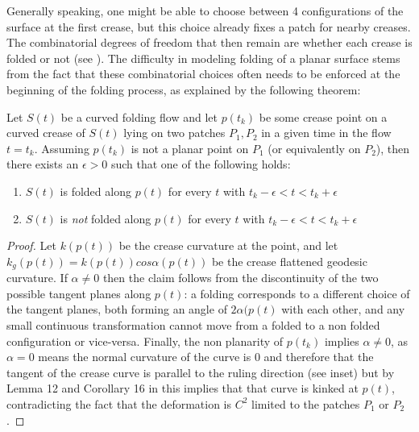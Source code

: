 Generally speaking, one might be able to choose between 4 configurations of the surface at the first crease, but this choice already fixes a patch for nearby creases. The combinatorial degrees of freedom that then remain are whether each crease is folded or not (see  ). The difficulty in modeling folding of a planar surface stems from the fact that these combinatorial choices often needs to be enforced at the beginning of the folding process, as explained by the following theorem:%

\begin{theorem}\label{Thm:curved_folding_open_condition}
Let $S(t)$ be a curved folding flow and let $p(t_k)$ be some crease point on a curved crease of $S(t)$ lying on two patches $P_1,P_2$ in a given time in the flow $t=t_k$. Assuming $p(t_k)$ is not a planar point on $P_1$ (or equivalently on $P_2$), then there exists an $\epsilon > 0$ such that one of the following holds:
\begin{enumerate}
	\item $S(t)$ is folded along $p(t)$ for every $t$ with $t_k-\epsilon < t < t_k+\epsilon$
	\item $S(t)$ is \emph{not} folded along $p(t)$ for every $t$ with  $t_k-\epsilon < t < t_k+\epsilon$
\end{enumerate}
\end{theorem}
\begin{proof}
Let $k(p(t))$ be the crease curvature at the point, and let $k_g(p(t)) = k(p(t))cos\alpha(p(t))$ be the crease flattened geodesic curvature. If $\alpha \neq 0$ then the claim follows from the discontinuity of the two possible tangent planes along $p(t)$: a folding corresponds to a different choice of the tangent planes, both forming an angle of $2\alpha(p(t)$ with each other, and any small continuous transformation cannot move from a folded to a non folded configuration or vice-versa. Finally, the non planarity of $p(t_k)$ implies $\alpha \neq 0$, as $\alpha = 0$ means the normal curvature of the curve is $0$ and therefore that the tangent of the crease curve is parallel to the ruling direction (see inset) but by Lemma 12 and Corollary 16 in \cite{demaine_lens} this implies that that curve is kinked at  $p(t)$, contradicting the fact that the deformation is $C^2$ limited to the patches $P_1$ or $P_2$.
\end{proof}
\setlength{\columnsep}{8pt}%
